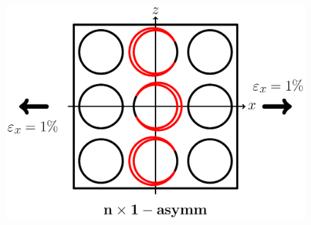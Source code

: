 \documentclass[first,firstsupp,lastsupp,last,hyperref,table]{ETHclass}
\begin{document}
\begin{frame}
\begin{columns}
\begin{column}{0.35\textwidth}
\begin{figure}
\end{figure}
\vspace{-0.5cm}
\begin{figure}
\centering
\includegraphics[width=\columnwidth]{twofibers-oppositeside-dtheta150.pdf}
\end{figure}
\end{column}
\end{columns}
\end{frame}
\end{document}
